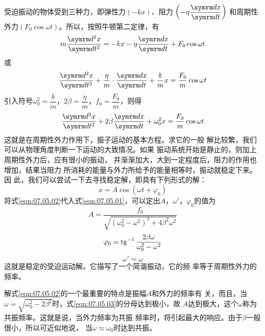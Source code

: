 受迫振动的物体受到三种力，即弹性力$ ( - k x ) $、阻力
$ \left( - \eta \dfrac { \dif x } { \dif t } \right) $
和周期性外力$ ( F _ { 0 } \cos \omega t ) $。所以，按照牛顿第二定律，有
\begin{equation*}
    m \frac { \dif ^ { 2 } x } { \dif t ^ { 2 } } = - k x - \eta \frac { \dif x } { \dif t } + F _ { 0 } \cos \omega t
\end{equation*}
或
\begin{equation*}
    \frac { \dif ^ { 2 } x } { \dif t ^ { 2 } } + \frac { \eta } { m } \cdot \frac { \dif x } { \dif t } + \frac { k } { m } x = \frac { F _ { 0 } } { m } \cos \omega t
  \end{equation*}
引入符号$ \omega _ { 0 } ^ { 2 } = \dfrac { k } { m } $，$ 2 \beta = \dfrac { \eta } { m } $，$ f _ { 0 } = \dfrac { F _ { 0 } } { m } $，则得
\begin{equation}\label{eqn:07.05.01}
    \frac { \dif ^ { 2 } x } { \dif t ^ { 2 } } + 2 \beta \frac { \dif x } { \dif t } + \omega _ { 0 } ^ { 2 } x = \frac { F _ { 0 } } { m } \cos \omega t
\end{equation}
这就是在周期性外力作用下，振子运动的基本方程。求它的一般
解比较繁，我们可以从物理角度判断一下运动的大致情况。如果
振动系统开始是静止的，则加上周期性外力后，应有很小的振动，
并渐渐加大，大到一定程度后，阻力的作用也增加，结果当阻力
所消耗的能量与外力所给予的能量相等时，振动就稳定下来。因
此，我们可以尝试一下去寻找稳定解，即具有下列形式的解：
\begin{equation}\label{eqn:07.05.02}
    x = A \cos ( \omega t + \varphi _ { 0 } )
\end{equation}
将式\ref{eqn:07.05.02}代入式\ref{eqn:07.05.01}，可以定出$ A $，$  \omega ' $，$ \varphi_{ 0 } $的值为
\begin{equation}\label{eqn:07.05.03}
    A = \frac { f _ { 0 } } { \sqrt { ( \omega_{ 0 } ^ { 2 } - \omega ^ { 2 } ) ^ { 2 } + 4 \beta ^ { 2 } \omega ^ { 2 } }}
\end{equation}
\begin{equation}\label{eqn:07.05.04}
    \varphi _ { 0 } = \operatorname{tg} ^ { - 1 } \frac { 2 \beta \omega } { \omega_{ 0 } ^ { 2 } - \omega ^ { 2 } }
\end{equation}
\begin{equation}\label{eqn:07.05.05}
    \omega ' = \omega
\end{equation}
这就是稳定的受迫运动解。它描写了一个简谐振动，它的频
率等于周期性外力的频率。

解式\eqref{eqn:07.05.02}的一个最重要的特点是振幅$ A $和外力的频率有
关，而且，当$ \omega = \sqrt { \omega _ { 0 } ^ { 2 } - 2 \beta ^ { 2 } } $时，式\eqref{eqn:07.05.03}的分母达到极小，故
$ A $达到极大，这个$ \omega $称为共振频率。这就是说，当外力频率为共振
频率时，将引起最大的响应。由于$ \beta $一般很小，所以可近似地说，
当$ \omega \approx \omega _ { 0 } $时达到共振。

